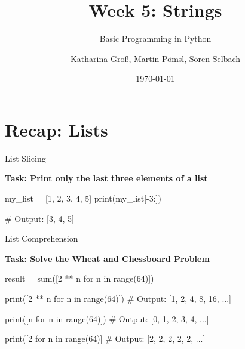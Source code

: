 



\title[Strings]{Week 5: Strings}
\subtitle{Basic Programming in Python}

\author[kgross, mpoemsl, sselbach]{Katharina Groß, Martin Pömsl, Sören Selbach}

\date{\today}

\begin{frame}[plain]
    \titlepage
\end{frame}

\begin{frame}
    \tableofcontents
\end{frame}


\section{Recap: Lists}

\begin{frame}[plain]
    \sectionpage
\end{frame}

\begin{frame}[fragile]{List Slicing}

    \textbf{Task: Print only the last three elements of a list}

    \begin{pythoncode}

my_list = [1, 2, 3, 4, 5]
print(my_list[-3:])

# Output: [3, 4, 5]

    \end{pythoncode}


\end{frame}

\begin{frame}[fragile]{List Comprehension}

    \textbf{Task: Solve the Wheat and Chessboard Problem}

    \begin{pythoncode}

result = sum([2 ** n for n in range(64)])

print([2 ** n for n in range(64)])
# Output: [1, 2, 4, 8, 16, ...]

print([n for n in range(64)])
# Output: [0, 1, 2, 3, 4, ...]

print([2 for n in range(64)]
# Output: [2, 2, 2, 2, 2, ...]
    \end{pythoncode}


\end{frame}

